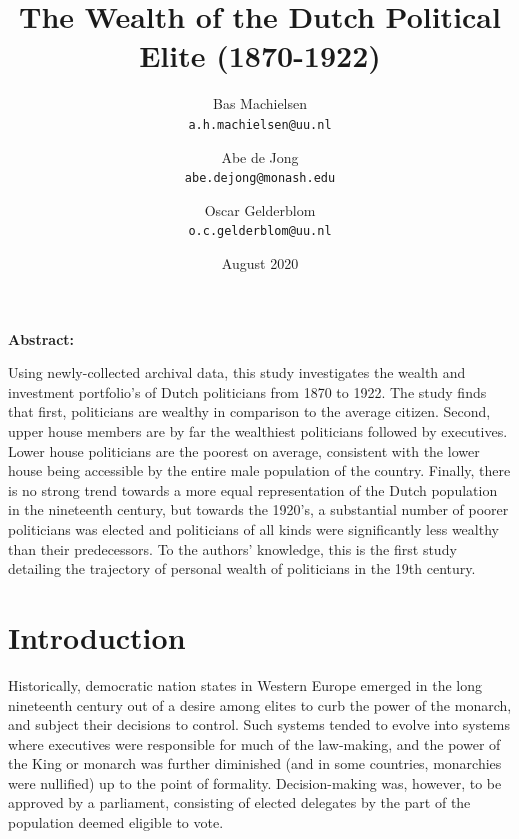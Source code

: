 
\usepackage[utf8]{inputenc}

\title{The Wealth of the Dutch Political Elite (1870-1922)}
\author{
  Bas Machielsen\\
  \texttt{a.h.machielsen@uu.nl}
  \and
  Abe de Jong\\
  \texttt{abe.dejong@monash.edu}
  \and
  Oscar Gelderblom\\
  \texttt{o.c.gelderblom@uu.nl}
}

\date{August 2020}



\maketitle

\begin{center}
\textbf{Abstract:}
\end{center}
Using newly-collected archival data, this study investigates the wealth and investment portfolio's of Dutch politicians from 1870 to 1922. The study finds that first, politicians are wealthy in comparison to the average citizen. Second, upper house members are by far the wealthiest politicians followed by executives. Lower house politicians are the poorest on average, consistent with the lower house being accessible by the entire male population of the country. Finally, there is no strong trend towards a more equal representation of the Dutch population in the nineteenth century, but towards the 1920's, a substantial number of poorer politicians was elected and politicians of all kinds were significantly less wealthy than their predecessors. To the authors' knowledge, this is the first study detailing the trajectory of personal wealth of politicians in the 19th century.
\clearpage

\section{Introduction}
Historically, democratic nation states in Western Europe emerged in the long nineteenth century out of a desire among elites to curb the power of the monarch, and subject their decisions to control. Such systems tended to evolve into systems where executives were responsible for much of the law-making, and the power of the King or monarch was further diminished (and in some countries, monarchies were nullified) up to the point of formality. Decision-making was, however, to be approved by a parliament, consisting of elected delegates by the part of the population deemed eligible to vote. 

